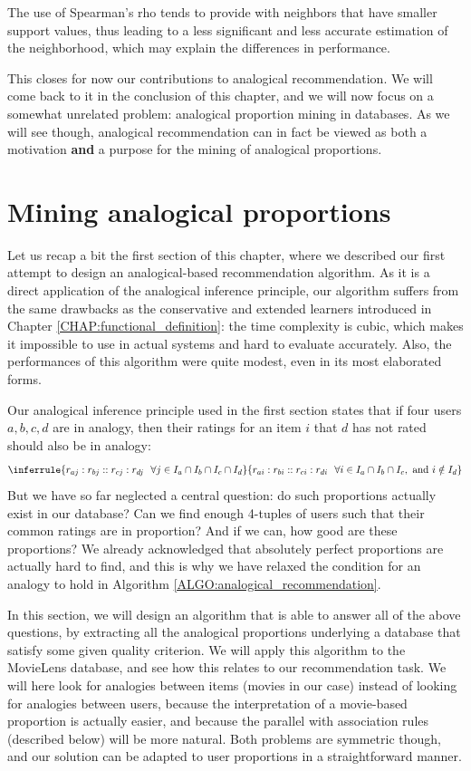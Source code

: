 The use of Spearman's rho tends to provide with neighbors that have smaller
support values, thus leading to a less significant and less accurate estimation
of the neighborhood, which may explain the differences in performance.

This closes for now our contributions to analogical recommendation. We will
come back to it in the conclusion of this chapter, and we will now focus on a
somewhat unrelated problem: analogical proportion mining in databases. As we
will see though, analogical recommendation can in fact be viewed as both a
motivation \textbf{and} a purpose for the mining of analogical proportions.

\section{Mining analogical proportions}
\label{SEC:mining_analogical_proportions}

Let us recap a bit the first section of this chapter, where we described our
first attempt to design an analogical-based recommendation algorithm. As it is
a direct application of the analogical inference principle, our algorithm
suffers from the same drawbacks as the conservative and extended learners
introduced in Chapter \ref{CHAP:functional_definition}: the time complexity is
cubic, which makes it impossible to use in actual systems and hard to evaluate
accurately. Also, the performances of this algorithm were quite modest, even in
its most elaborated forms.

Our analogical inference principle used in the first section states that if
four users $a, b, c, d$ are in analogy, then their ratings for an item $i$ that
$d$ has not rated should also be in analogy:
$$
\inferrule{r_{aj} : r_{bj} :: r_{cj} : r_{dj} ~~ \forall j \in
I_a \cap I_b \cap I_c \cap  I_d}
{r_{ai} : r_{bi} :: r_{ci} : r_{di} ~~ \forall i \in I_a \cap I_b \cap I_c,
\text{ and } i\notin I_d }
$$
But we have so far neglected a central question: do such proportions actually
exist in our database? Can we find enough 4-tuples of users such that their
common ratings are in proportion? And if we can, how good are these proportions? We already
acknowledged that absolutely perfect proportions are actually hard to find, and
this is why we have relaxed the condition for an analogy to hold in Algorithm
\ref{ALGO:analogical_recommendation}.

In this section, we will design an algorithm that is able to answer all of
the above questions, by extracting all the analogical proportions underlying a
database that satisfy some given quality criterion. We will apply this algorithm
to the MovieLens database, and see how this relates to our recommendation task.
We will here look for analogies between items (movies in our case) instead of
looking for analogies between users, because the interpretation of a
movie-based proportion is actually easier, and because the parallel with
association rules (described below) will be more natural. Both problems are
symmetric though, and our solution can be adapted to user proportions in a
straightforward manner.

